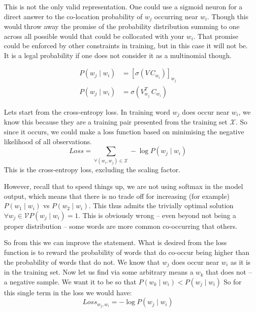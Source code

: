 \documentclass[parskip]{komatufte}
\begin{document}
This is not the only valid representation.
One could use a sigmoid neuron for a direct answer to the co-location probability of $w_j$ occurring near $w_i$.
Though this would throw away the promise of the probability distribution summing to one across all possible would that could be collocated with your $w_i$.
That promise could be enforced by other constraints in training, but in this case it will not be.
It is a legal probability if one does not consider it as a multinomial though.

\begin{align}
P(w_j \mid w_{i}) & = \left[\sigma(V\,C_{w_{i}}) \right]_{w_j} \\
P(w_j \mid w_{i}) & = \sigma(V_{w_j}^T\,C_{w_{i}})
\end{align}



Lets start from the cross-entropy loss.
In training word $w_j$ does occur near $w_i$, we know this because they are a training pair presented from the training set $\mathcal{X}$.
So since it occurs, we could make a loss function based on minimising the negative likelihood of all observations.
\begin{equation}
Loss = \sum_{\forall (w_i,w_j)\in \mathcal{X}} -\log P(w_j\mid w_i)
\end{equation}
This is the cross-entropy loss, excluding the scaling factor.

However, recall that to speed things up, we are not using softmax in the model output,
which means that there is no trade off for increasing (for example) $P(w_1\mid w_i)$ vs $P(w_2\mid w_i)$.
This thus admits the trivially optimal solution $\forall w_j\in \mathcal{V} P(w_j \mid w_i) = 1$.
This is obviously wrong -- even beyond not being a proper distribution -- some words are more common co-occurring that others.

So from this we can improve the statement.
What is desired from the loss function is to reward the probability of words that do co-occur being higher than the probability of words that do not.
We know that $w_j$ does occur near $w_i$ as it is in the training set.
Now let us find via some arbitrary means a $w_k$ that does not -- a negative sample.
We want it to be so that $P(w_k\mid w_i) < P(w_j\mid w_i)$
So for this single term in the loss we would have:
\begin{equation}
Loss_{w_j,w_i} =   - \log P(w_j\mid w_i)
\end{equation}

\end{document}
